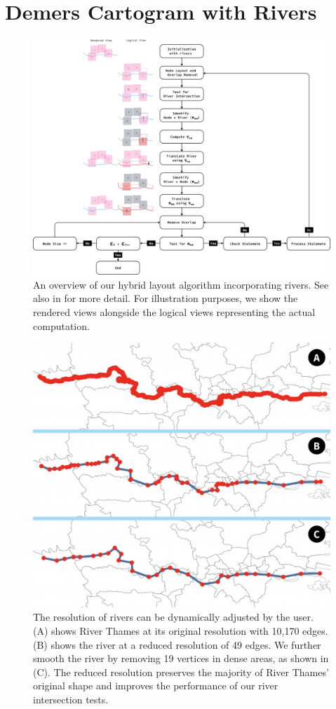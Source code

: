 \section{Demers Cartogram with Rivers}
 {
  \begin{figure}[tb!]
      \centering
      \includegraphics[width=\textwidth,height=\textheight,keepaspectratio]{figure/flowchart.png}
      \caption{An overview of our hybrid layout algorithm incorporating rivers. See also  in  for more detail. %
       For illustration purposes, we show the rendered views alongside the logical views representing the actual computation.}
      \label{fig:flowchart}
  \end{figure}
 }

 {
  \begin{figure}[tb!]
      \centering
      \includegraphics[width=0.7\columnwidth,keepaspectratio]{figure/river_resolution.png}
      \caption{The resolution of rivers can be dynamically adjusted by the user. (A) shows River Thames at its original resolution with 10,170 edges. (B) shows the river at a reduced resolution of 49 edges. We further smooth the river by removing 19 vertices in dense areas, as shown in (C). The reduced resolution preserves the majority of River Thames' original shape and improves the performance of our river intersection tests.}
      \label{fig:river resolution}
  \end{figure}
 }

